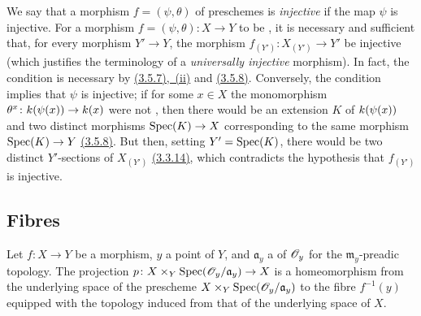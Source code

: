 \begin{rmk}[3.5.11]
\label{rmk-1.3.5.11}
We say that a morphism $f=(\psi,\theta)$ of preschemes is \emph{injective} if the map $\psi$ is injective.
For a morphism $f=(\psi,\theta)\colon X\to Y$ to be , it is necessary and sufficient that, for every morphism $Y'\to Y$, the morphism $f_{(Y')}\colon X_{(Y')}\to Y'$ be injective (which justifies the terminology of a \emph{universally injective} morphism).
In fact, the condition is necessary by \hyperref[prop-1.3.5.7]{(3.5.7),~(ii)} and \hyperref[prop-1.3.5.8]{(3.5.8)}.
Conversely, the condition implies that $\psi$ is injective; if for some $x\in X$ the monomorphism $\theta^x\colon k(\psi(x))\to k(x)$ were not , then there would be an extension $K$ of $k(\psi(x))$ and two distinct morphisms ${\mathop{\mathrm{Spec}}\nolimits}(K)\to X$ corresponding to the same morphism ${\mathop{\mathrm{Spec}}\nolimits}(K)\to Y$ \hyperref[prop-1.3.5.8]{(3.5.8)}.
But then, setting $Y'={\mathop{\mathrm{Spec}}\nolimits}(K)$, there would be two distinct $Y'$-sections of $X_{(Y')}$ \hyperref[env-1.3.3.14]{(3.3.14)}, which contradicts the hypothesis that $f_{(Y')}$ is injective.
\end{rmk}

\subsection{Fibres}
\label{subsection-fibres}

\begin{prop}[3.6.1]
\label{prop-1.3.6.1}
Let $f\colon X\to Y$ be a morphism, $y$ a point of $Y$, and $\mathfrak{a}_y$ a  of $\mathscr{O}_y$ for the $\mathfrak{m}_y$-preadic topology.
The projection $p\colon X\times_Y{\mathop{\mathrm{Spec}}\nolimits}(\mathscr{O}_y/\mathfrak{a}_y)\to X$ is a homeomorphism from the underlying space of the prescheme $X\times_Y{\mathop{\mathrm{Spec}}\nolimits}(\mathscr{O}_y/\mathfrak{a}_y)$ to the fibre $f^{-1}(y)$ equipped with the topology induced from that of the underlying space of $X$.
\end{prop}

